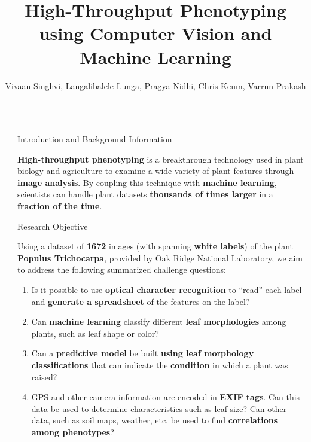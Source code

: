 \documentclass[final]{beamer}
\title{High-Throughput Phenotyping using Computer Vision and Machine Learning}
\author{Vivaan Singhvi, Langalibalele Lunga, Pragya Nidhi, Chris Keum, Varrun Prakash}
\institute{Farragut High School}
\newlength{\sepwidth}
\newlength{\colwidth}
\newcommand{\separatorcolumn}{\begin{column}{\sepwidth}\end{column}}
\begin{document}
\begin{frame}[t]
\begin{columns}[t]
\separatorcolumn

\begin{column}{\colwidth}

\begin{block}{Introduction and Background Information}


\textbf{High-throughput phenotyping} is a breakthrough technology used in plant biology and agriculture to examine a wide variety of plant features through \textbf{image analysis}. By coupling this technique with \textbf{machine learning}, scientists can handle plant datasets \textbf{thousands of times larger} in a \textbf{fraction of the time}.


\end{block}

\begin{alertblock}{Research Objective}


Using a dataset of \textbf{1672} images (with spanning \textbf{white labels}) of the plant \textbf{Populus Trichocarpa}, provided by Oak Ridge National Laboratory, we aim to address the following summarized challenge questions:


\begin{enumerate}
    
    \item Is it possible to use \textbf{optical character recognition} to “read” each label and \textbf{generate a spreadsheet} of the features on the label?
    \item Can \textbf{machine learning} classify different \textbf{leaf morphologies} among plants, such as leaf shape or color?
    \item Can a \textbf{predictive model} be built \textbf{using leaf morphology classifications} that can indicate the \textbf{condition} in which a plant was raised?
    \item GPS and other camera information are encoded in \textbf{EXIF tags}. Can this data be used to determine characteristics such as leaf size? Can other data, such as soil maps, weather, etc. be used to find \textbf{correlations among phenotypes}?


\end{enumerate}
\end{alertblock}
\end{column}
\end{columns}
\end{frame}
\end{document}
